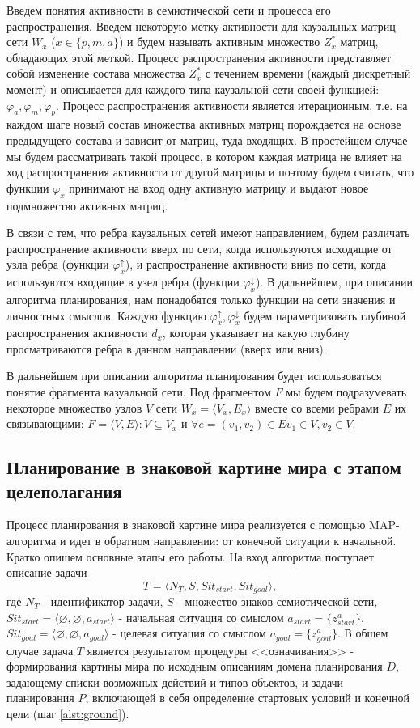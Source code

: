 \documentclass[12pt]{report}
\begin{document}
	Введем понятия активности в семиотической сети и процесса его распространения. Введем некоторую метку активности для каузальных матриц сети $W_x$ ($x\in\{p,m,a\}$) и будем называть активным множество $Z_x^*$ матриц, обладающих этой меткой. Процесс распространения активности представляет собой изменение состава  множества $Z_x^*$ с течением времени (каждый дискретный момент) и описывается для каждого типа каузальной сети своей функцией: $\varphi_a, \varphi_m,\varphi_p$. Процесс распространения активности является итерационным, т.е. на каждом шаге новый состав множества активных матриц порождается на основе предыдущего состава и зависит от матриц, туда входящих. В простейшем случае мы будем рассматривать такой процесс, в котором каждая матрица не влияет на ход распространения активности от другой матрицы и поэтому будем считать, что функции $\varphi_x$ принимают на вход одну активную  матрицу и выдают новое подмножество активных матриц. 
	
	В связи с тем, что ребра каузальных сетей имеют направлением, будем различать распространение активности вверх по сети, когда используются исходящие от узла ребра (функции $\varphi_x^\uparrow$), и распространение активности вниз по сети, когда используются входящие в узел ребра (функции $\varphi_x^\downarrow$). В дальнейшем, при описании алгоритма планирования, нам понадобятся только функции на сети значения и личностных смыслов. Каждую функцию $\varphi_x^\uparrow,\varphi_x^\downarrow$ будем параметризовать глубиной распространения активности $d_x$, которая указывает на какую глубину просматриваются ребра в данном направлении (вверх или вниз).
	
	В дальнейшем при описании алгоритма планирования будет использоваться понятие фрагмента казуальной сети. Под фрагментом $F$ мы будем подразумевать некоторое множество узлов $V$ сети $W_x=\langle V_x,E_x\rangle$ вместе со всеми ребрами $E$ их связывающими: $F=\langle V,E\rangle: V\subseteq V_x$ и $\forall e=(v_1,v_2)\in E v_1\in V, v_2\in V$.
	
	\subsection{Планирование в знаковой картине мира с этапом целеполагания}\label{sec:plan}
	
	Процесс планирования в знаковой картине мира реализуется с помощью MAP-алгоритма и идет в обратном направлении: от конечной ситуации к начальной. Кратко опишем основные этапы его работы. На вход алгоритма поступает описание задачи 
	\[T = \langle N_T,S,Sit_{start}, Sit_{goal}\rangle,\]
	где $N_T$ - идентификатор задачи, $S$ - множество знаков семиотической сети, $Sit_{start}=\langle \varnothing, \varnothing, a_{start} \rangle$ - начальная ситуация со смыслом $a_{start}=\{z_{start}^a\}$, $Sit_{goal}=\langle \varnothing, \varnothing, a_{goal} \rangle$ - целевая ситуация со смыслом $a_{goal}=\{z_{goal}^a\}$. В общем случае задача $T$ является результатом процедуры <<означивания>> - формирования картины мира по исходным описаниям домена планирования $D$, задающему списки возможных действий и типов объектов, и задачи планирования $P$, включающей в себя определение стартовых условий и конечной цели (шаг \ref{alst:ground}).
	
\end{document}
